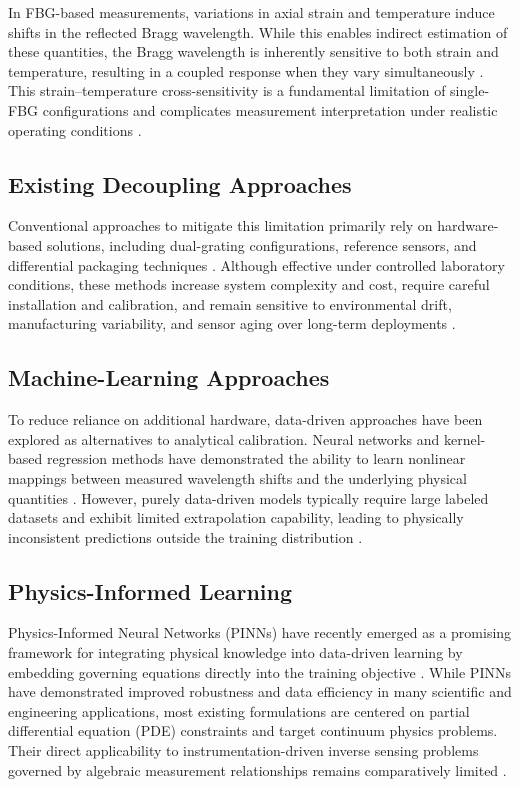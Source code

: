 \documentclass[journal,twoside,web]{ieeecolor}
\begin{document}
In FBG-based measurements, variations in axial strain and temperature induce
shifts in the reflected Bragg wavelength. While this enables indirect
estimation of these quantities, the Bragg wavelength is inherently sensitive
to both strain and temperature, resulting in a coupled response when they
vary simultaneously \cite{b8,b9}. This strain--temperature cross-sensitivity
is a fundamental limitation of single-FBG configurations and complicates
measurement interpretation under realistic operating conditions \cite{b10}.

\subsection{Existing Decoupling Approaches}

Conventional approaches to mitigate this limitation primarily rely on
hardware-based solutions, including dual-grating configurations, reference
sensors, and differential packaging techniques \cite{b11,b12}. Although
effective under controlled laboratory conditions, these methods increase
system complexity and cost, require careful installation and calibration,
and remain sensitive to environmental drift, manufacturing variability, and
sensor aging over long-term deployments \cite{b13}.

\subsection{Machine-Learning Approaches}

To reduce reliance on additional hardware, data-driven approaches have been
explored as alternatives to analytical calibration. Neural networks and
kernel-based regression methods have demonstrated the ability to learn
nonlinear mappings between measured wavelength shifts and the underlying
physical quantities \cite{b14,b15}. However, purely data-driven models
typically require large labeled datasets and exhibit limited extrapolation
capability, leading to physically inconsistent predictions outside the
training distribution \cite{b16}.

\subsection{Physics-Informed Learning}

Physics-Informed Neural Networks (PINNs) have recently emerged as a
promising framework for integrating physical knowledge into data-driven
learning by embedding governing equations directly into the training
objective \cite{b17}. While PINNs have demonstrated improved robustness and
data efficiency in many scientific and engineering applications, most
existing formulations are centered on partial differential equation (PDE)
constraints and target continuum physics problems. Their direct
applicability to instrumentation-driven inverse sensing problems governed by
algebraic measurement relationships remains comparatively limited
\cite{b18,b19}.
\end{document}
